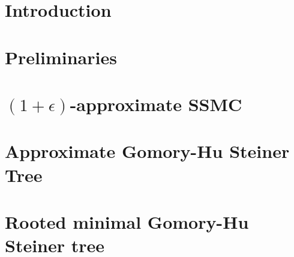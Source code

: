 \documentclass[11pt]{article}
\newcommand{\e}{\epsilon}
\newcommand{\1}{\mathbbm 1}
\begin{document}
\setcounter{page}{1}

\section{Introduction}
\label{sec:introduction}


\section{Preliminaries}


\section{$(1+\e)$-approximate SSMC}


\section{Approximate Gomory-Hu Steiner Tree}



\appendix

\section{Rooted minimal Gomory-Hu Steiner tree}

\end{document}
